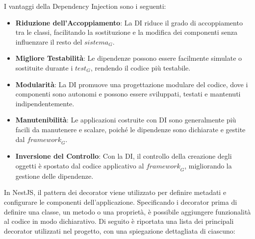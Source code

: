 \newpage
I vantaggi della Dependency Injection sono i seguenti:
\begin{itemize}
\item \textbf{Riduzione dell'Accoppiamento}: La DI riduce il grado di accoppiamento tra le classi, facilitando la sostituzione e la modifica dei componenti senza influenzare il resto del $\textit{sistema}_G$.
\item \textbf{Migliore Testabilità}: Le dipendenze possono essere facilmente simulate o sostituite durante i $\textit{test}_G$, rendendo il codice più testabile.
\item \textbf{Modularità}: La DI promuove una progettazione modulare del codice, dove i componenti sono autonomi e possono essere sviluppati, testati e mantenuti indipendentemente.
\item \textbf{Manutenibilità}: Le applicazioni costruite con DI sono generalmente più facili da manutenere e scalare, poiché le dipendenze sono dichiarate e gestite dal $\textit{framework}_G$.
\item \textbf{Inversione del Controllo}: Con la DI, il controllo della creazione degli oggetti è spostato dal codice applicativo al $\textit{framework}_G$, migliorando la gestione delle dipendenze.
\end{itemize}

In NestJS, il pattern dei decorator viene utilizzato per definire metadati e configurare le componenti dell'applicazione. Specificando i decorator prima di definire una classe, un metodo o una proprietà, è possibile aggiungere funzionalità al codice in modo dichiarativo. Di seguito è riportata una lista dei principali decorator utilizzati nel progetto, con una spiegazione dettagliata di ciascuno:

